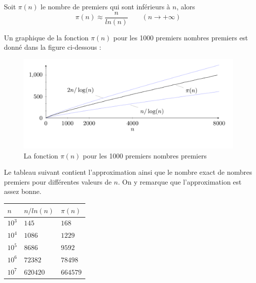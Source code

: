 		\vspace{-1.5em}\begin{adjustwidth}{1.5cm}{1.5cm} 
		\begin{Th}
			Soit $\pi(n)$ le nombre de premiers qui sont inférieurs à $n$, alors
			\[\pi(n) \approx \frac{n}{ln(n)} \quad \quad (n \to +\infty)\]
		\end{Th}
		\end{adjustwidth}\vspace{0.5em}
		
	Un graphique de la fonction $\pi(n)$ pour les 1000 premiers nombres premiers est donné dans la figure ci-dessous :
	\begin{figure}[H]
		\begin{center}\includegraphics[scale=0.4]{img/freqPremiers.png}\end{center}\vspace{-3em}
		\caption{La fonction $\pi(n)$ pour les 1000 premiers nombres premiers}\label{fig:M3}
	\end{figure}
	
	Le tableau suivant contient l'approximation ainsi que le nombre exact de nombres premiers pour différentes valeurs de $n$. On y remarque que l'approximation est assez bonne.
	\begin{table}[H]\begin{center}
		\begin{tabular}{|lll|}
		\hline
		$n$  & $n/ln(n)$ & $\pi(n)$     \\ \hline
		$10^{3}$ & $145$     & $168$     \\
		$10^{4}$ & $1 086$   & $1 229$   \\
		$10^{5}$ & $8 686$   & $9 592$   \\
		$10^{6}$ & $72 382$  & $78 498$  \\
		$10^{7}$ & $620 420$ & $664 579$ \\ \hline
		\end{tabular}
	\end{center}\end{table}
	
